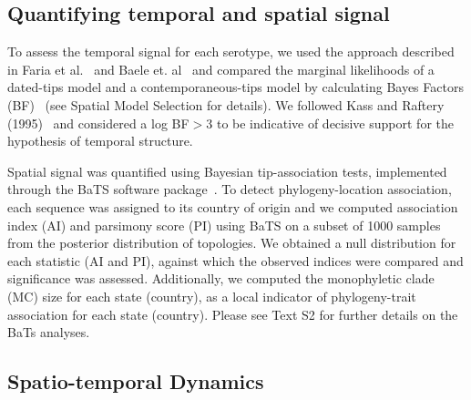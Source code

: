\documentclass[10pt]{article}
\begin{document}
\subsection*{Quantifying temporal and spatial signal} 

To assess the temporal signal for each serotype, we used the approach described in Faria et al.~\cite{Faria2012} and Baele et. al~\cite{Baele2012} and compared the marginal likelihoods of a dated-tips model and a contemporaneous-tips model by calculating Bayes Factors (BF)~\cite{Suchard2001, suchard2005models} (see Spatial Model Selection for details).
We followed Kass and Raftery (1995)~\cite{KassRaftery1995} and considered a log BF$>$3 to be indicative of decisive support for the hypothesis of temporal structure.

Spatial signal was quantified using Bayesian tip-association tests, implemented through the BaTS software package~\cite{bats}.
To detect phylogeny-location association, each sequence was assigned to its country of origin and we computed association index (AI) and parsimony score (PI) using BaTS on  a subset of 1000 samples from the posterior distribution of topologies.
We obtained a null distribution for each statistic (AI and PI), against which the observed indices were compared and significance was assessed.
Additionally, we computed the monophyletic clade (MC) size for each state (country), as a local indicator of phylogeny-trait association for each state (country).
Please see Text S2 for further details on the BaTs analyses.

\subsection*{Spatio-temporal Dynamics}
\end{document}
